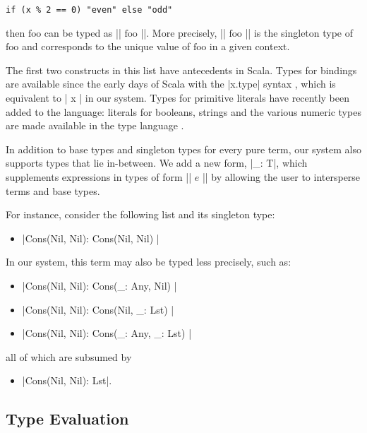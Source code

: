 \begin{lstlisting}
if (x % 2 == 0) "even" else "odd"
\end{lstlisting}

\noindent then $\text{foo}$ can be typed as |{| $\text{foo}$ |}|.
More precisely, |{| $\text{foo}$ |}| is the singleton type of $\text{foo}$ and corresponds to the unique value of $\text{foo}$ in a given context.

The first two constructs in this list have antecedents in Scala.
Types for bindings are available since the early days of Scala with the |x.type| syntax \citep[Section 3.2.1]{odersky2006scala}, which is equivalent to |{ x }| in our system.
Types for primitive literals have recently been added to the language: literals for booleans, strings and the various numeric types are made available in the type language \citep{leontiev2014sip}.

In addition to base types and singleton types for every pure term, our system also supports types that lie in-between. We add a new form, |_: T|, which supplements expressions in types of form |{| $e$ |}| by allowing the user to intersperse terms and base types.

For instance, consider the following list and its singleton type:

\begin{itemize}
  \item |Cons(Nil, Nil): { Cons(Nil, Nil) }|
\end{itemize}

In our system, this term may also be typed less precisely, such as:

\begin{itemize}
  \item |Cons(Nil, Nil): { Cons(_: Any, Nil) }|
  \item |Cons(Nil, Nil): { Cons(Nil, _: Lst) }|
  \item |Cons(Nil, Nil): { Cons(_: Any, _: Lst) }|
\end{itemize}

\noindent
all of which are subsumed by

\begin{itemize}
  \item |Cons(Nil, Nil): Lst|.
\end{itemize}

\subsection{Type Evaluation}

